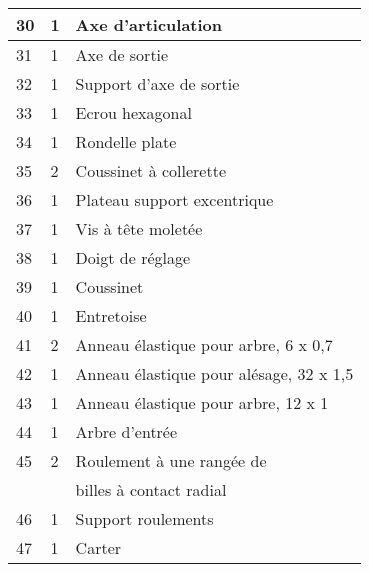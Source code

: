 \begin{center}
\begin{tabular}{|l|l|l|}
30&
1&
Axe d'articulation \\ \hline %
31&
1&
Axe de sortie \\ \hline %
32&
1&
Support d'axe de sortie \\ \hline %
33&
1&
Ecrou hexagonal \\ \hline %
34&
1&
Rondelle plate \\ \hline %
35&
2&
Coussinet à collerette \\ \hline %
36&
1&
Plateau support excentrique \\ \hline %
37&
1&
Vis à tête moletée \\ \hline %
38&
1&
Doigt de réglage \\ \hline %
39&
1&
Coussinet \\ \hline %
40&
1&
Entretoise  \\ \hline 
41&
2&
Anneau élastique pour arbre, 6 x 0,7  \\ \hline %
42&
1&
Anneau élastique pour alésage, 32 x 1,5 \\ \hline %
43&
1&
Anneau élastique pour arbre, 12 x 1 \\ \hline %
44&
1&
Arbre d’entrée \\ \hline %
45&
2&
Roulement à une rangée de \\ 
&& billes à contact radial \\ \hline %
46&
1&
Support roulements \\ \hline %
47&
1&
Carter \\ \hline %

\end{tabular}
\end{center}
